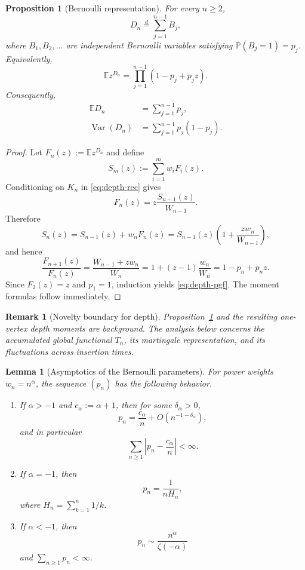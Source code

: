 \documentclass[11pt,a4paper]{article}
\newtheorem{proposition}[theorem]{Proposition}
\newtheorem{lemma}[theorem]{Lemma}
\newtheorem{remark}[theorem]{Remark}
\newcommand{\E}{\mathbb{E}}
\newcommand{\Pp}{\mathbb{P}}
\newcommand{\Var}{\operatorname{Var}}
\newcommand{\1}{\mathbf{1}}
\begin{document}
\begin{proposition}[Bernoulli representation]\label{prop:bernoulli}
For every $n\ge2$,
\[
D_n\overset{d}=\sum_{j=1}^{n-1}B_j,
\]
where $B_1,B_2,\ldots$ are independent Bernoulli variables satisfying
$\Pp(B_j=1)=p_j$.  Equivalently,
\begin{equation}\label{eq:depth-pgf}
\E z^{D_n}
=
\prod_{j=1}^{n-1}(1-p_j+p_jz).
\end{equation}
Consequently,
\begin{align}
\E D_n&=\sum_{j=1}^{n-1}p_j,\label{eq:ED}\\
\Var(D_n)&=\sum_{j=1}^{n-1}p_j(1-p_j).\label{eq:VD}
\end{align}
\end{proposition}

\begin{proof}
Let $F_n(z):=\E z^{D_n}$ and define
\[
S_m(z):=\sum_{i=1}^m w_iF_i(z).
\]
Conditioning on $K_n$ in \eqref{eq:depth-rec} gives
\[
F_n(z)=z\frac{S_{n-1}(z)}{W_{n-1}}.
\]
Therefore
\[
S_n(z)
=
S_{n-1}(z)+w_nF_n(z)
=
S_{n-1}(z)\left(1+\frac{zw_n}{W_{n-1}}\right),
\]
and hence
\[
\frac{F_{n+1}(z)}{F_n(z)}
=
\frac{W_{n-1}+zw_n}{W_n}
=
1+(z-1)\frac{w_n}{W_n}
=
1-p_n+p_nz.
\]
Since $F_2(z)=z$ and $p_1=1$, induction yields
\eqref{eq:depth-pgf}.  The moment formulas follow immediately.
\end{proof}

\begin{remark}[Novelty boundary for depth]\label{rem:depth-boundary}
Proposition~\ref{prop:bernoulli} and the resulting one-vertex depth moments are
background.  The analysis below concerns the accumulated global functional
$T_n$, its martingale representation, and its fluctuations across insertion
times.
\end{remark}

\begin{lemma}[Asymptotics of the Bernoulli parameters]\label{lem:p-asym}
For power weights $w_n=n^\alpha$, the sequence $(p_n)$ has the following behavior.
\begin{enumerate}[label=(\roman*)]
\item If $\alpha>-1$ and $c_\alpha:=\alpha+1$, then for some
$\delta_\alpha>0$,
\begin{equation}\label{eq:p-supercrit}
p_n=\frac{c_\alpha}{n}+O(n^{-1-\delta_\alpha}),
\end{equation}
and in particular
\[
\sum_{n\ge1}\left|p_n-\frac{c_\alpha}{n}\right|<\infty.
\]

\item If $\alpha=-1$, then
\begin{equation}\label{eq:p-critical}
p_n=\frac{1}{nH_n},
\end{equation}
where $H_n=\sum_{k=1}^n1/k$.

\item If $\alpha<-1$, then
\begin{equation}\label{eq:p-old}
p_n\sim\frac{n^\alpha}{\zeta(-\alpha)}
\end{equation}
and $\sum_{n\ge1}p_n<\infty$.
\end{enumerate}
\end{lemma}
\end{document}

